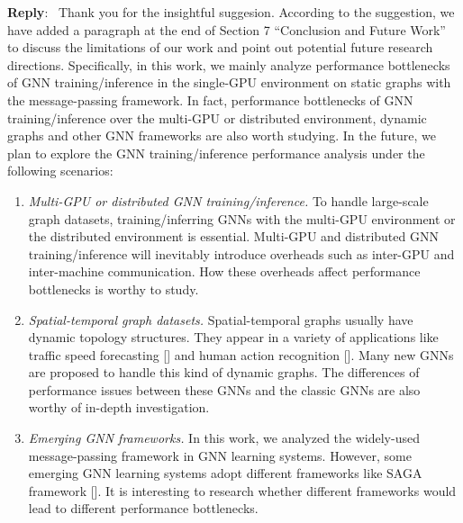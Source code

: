 \documentclass[12pt]{article}
\newcounter{reviewer}
\newcounter{point}[reviewer]
\newenvironment{reply}
   {\medskip \noindent \textbf{Reply}:\  }
   {\medskip}
\begin{document}
\begin{reply}
    Thank you for the insightful suggesion.
    According to the suggestion, we have added a paragraph at the end of Section 7 ``Conclusion and Future Work'' to discuss the limitations of our work and point out potential future research directions.
    Specifically, in this work, we mainly analyze performance bottlenecks of GNN training/inference in the single-GPU environment on static graphs with the message-passing framework.
    In fact, performance bottlenecks of GNN training/inference over the multi-GPU or distributed environment, dynamic graphs and other GNN frameworks are also worth studying.
    In the future, we plan to explore the GNN training/inference performance analysis under the following scenarios:
\begin{enumerate}
    \item \emph{Multi-GPU or distributed GNN training/inference.}
    To handle large-scale graph datasets, training/inferring GNNs with the multi-GPU environment or the distributed environment is essential.
    Multi-GPU and distributed GNN training/inference will inevitably introduce overheads such as inter-GPU and inter-machine communication. 
    How these overheads affect performance bottlenecks is worthy to study.

    \item \emph{Spatial-temporal graph datasets.}
    Spatial-temporal graphs usually have dynamic topology structures.
    They appear in a variety of applications like traffic speed forecasting [\cite{li2018_DCRNN}] and human action recognition [\cite{yan2018_STGCN}].
    Many new GNNs are proposed to handle this kind of dynamic graphs.
    The differences of performance issues between these GNNs and the classic GNNs are also worthy of in-depth investigation. 

    \item \emph{Emerging GNN frameworks.}
    In this work, we analyzed the widely-used message-passing framework in GNN learning systems.
    However, some emerging GNN learning systems adopt different frameworks like SAGA framework [\cite{ma2019_neugraph}].
    It is interesting to research whether different frameworks would lead to different performance bottlenecks.
\end{enumerate}

\end{reply}



\end{document}

